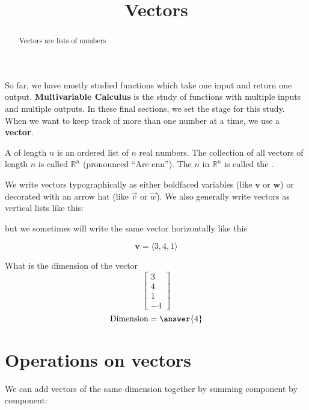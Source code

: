 \documentclass{ximera}
\title[Dig-In:]{Vectors}
\begin{document}
\begin{abstract}
  Vectors are lists of numbers
\end{abstract}
\maketitle

So far, we have mostly studied functions which take one input and
return one output.  \textbf{Multivariable Calculus} is the study of
functions with multiple inputs and multiple outputs.  In these final
sections, we set the stage for this study.  When we want to keep track
of more than one number at a time, we use a \textbf{vector}.

\begin{definition}
  A  of length $n$ is an ordered list of $n$ real numbers.
  The collection of all vectors of length $n$ is called $\mathbb{R}^n$
  (pronounced ``Are enn'').  The $n$ in $\mathbb{R}^n$ is called the
  .
\end{definition}

We write vectors typographically as either boldfaced variables (like
$\mathbf{v}$ or $\mathbf{w}$) or decorated with an arrow hat (like
$\vec{v}$ or $\vec{w}$).  We also generally write vectors as vertical
lists like this:

but we sometimes will write the same vector horizontally like this

\[
\mathbf{v} = \langle 3, 4, 1 \rangle
\]

\begin{question}
  What is the dimension of the vector 
  \[
  \begin{bmatrix} 3 \\ 4 \\1 \\ -4 \end{bmatrix}
  \]
  \[
  \textrm{Dimension} = \answer{4}
  \]
\end{question}

\section{Operations on vectors}

We can add vectors of the same dimension together by summing component by component:
\end{document}
